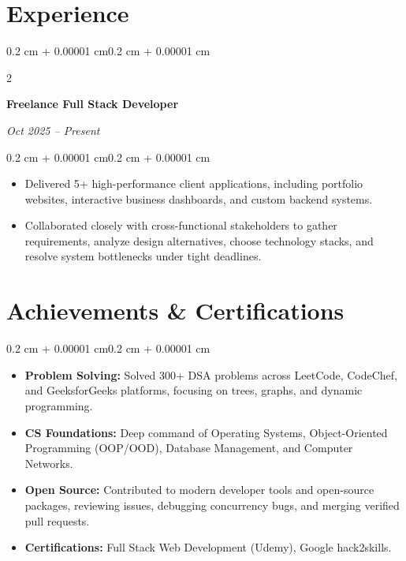 \documentclass[10pt, letterpaper]{article}
\newenvironment{highlights}{
    \begin{itemize}[
        topsep=0pt,
        parsep=0pt,
        partopsep=0pt,
        itemsep=0pt,
        leftmargin=0.4 cm + 10pt
    ]
}{
    \end{itemize}
}
\newenvironment{onecolentry}{
    \begin{adjustwidth}{0.2 cm + 0.00001 cm}{0.2 cm + 0.00001 cm}
}{
    \end{adjustwidth}
}
\newenvironment{twocolentry}[2][]{
    \onecolentry
    \def\secondColumn{#2}
    \setcolumnwidth{\fill, 4.5 cm}
    \begin{paracol}{2}
}{
    \switchcolumn \raggedleft \secondColumn
    \end{paracol}
    \endonecolentry
}
\begin{document}
\section{Experience}

\begin{twocolentry}{
\textit{Oct 2025 – Present}}
    \textbf{Freelance Full Stack Developer} \quad {}
\end{twocolentry}
\vspace{0.03 cm}
\begin{onecolentry}
    \begin{highlights}
        \item Delivered 5+ high-performance client applications, including portfolio websites, interactive business dashboards, and custom backend systems.
        \item Collaborated closely with cross-functional stakeholders to gather requirements, analyze design alternatives, choose technology stacks, and resolve system bottlenecks under tight deadlines.
    \end{highlights}
\end{onecolentry}

\section{Achievements \& Certifications}
\begin{onecolentry}
    \begin{highlights}
        \item \textbf{Problem Solving:} Solved 300+ DSA problems across LeetCode, CodeChef, and GeeksforGeeks platforms, focusing on trees, graphs, and dynamic programming.
        \item \textbf{CS Foundations:} Deep command of Operating Systems, Object-Oriented Programming (OOP/OOD), Database Management, and Computer Networks.
        \item \textbf{Open Source:} Contributed to modern developer tools and open-source packages, reviewing issues, debugging concurrency bugs, and merging verified pull requests.
        \item \textbf{Certifications:} Full Stack Web Development (Udemy), Google hack2skills.
    \end{highlights}
\end{onecolentry}
\end{document}
